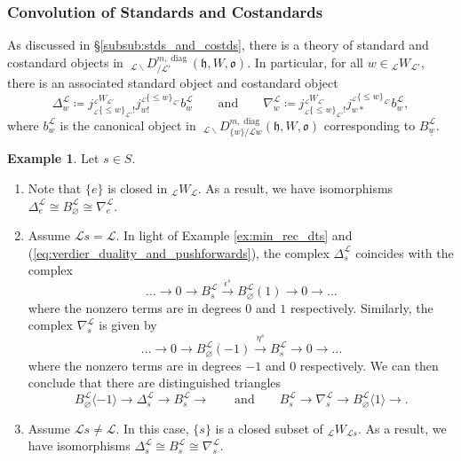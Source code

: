 \documentclass{amsart}
\newcommand{\scrL}{\mathcal{L}}
\newcommand{\fr}[1]{\mathfrak{#1}}
\DeclareMathOperator{\diag}{diag}
\newcommand{\DDBE}[2]{\:_{#1 \backslash} D_{/ #2}^{m, \diag}}
\newcommand{\DDBEI}[3]{\:_{#2 \backslash} D_{#1 / #3}^{m, \diag} }
\newcommand{\W}[2]{{}_{#1}W_{#2}}
\newcommand{\uw}{\underline{w}}
\renewcommand{\emptyset}{\varnothing}
\theoremstyle{definition}
\newtheorem{example}[subsubsection]{Example}
\numberwithin{equation}{subsection}
\begin{document}
\subsubsection{Convolution of Standards and Costandards}

As discussed in \S\ref{subsub:stds_and_costds}, there is a theory of standard and costandard objects in $\DDBE{\scrL}{\scrL'} (\fr{h}, W, \fr{o})$.
In particular, for all $w \in \W{\scrL}{\scrL'}$, there is an associated standard object and costandard object
\[ \Delta_w^{\scrL} \coloneq j_{{}_{\scrL }\{\leq w \}_{\scrL'} !}^{\W{\scrL}{\scrL'}} j_{w!}^{{}_{\scrL} \{\leq w \}_{\scrL'} } b_w^{\scrL} \qquad\text{and}\qquad \nabla_w^{\scrL} \coloneq j_{{}_{\scrL} \{\leq w \}_{\scrL'} !}^{\W{\scrL}{\scrL'}} j_{w*}^{{}_{\scrL} \{\leq w \}_{\scrL'}} b_w^{\scrL},\]
where $b_w^{\scrL}$ is the canonical object in $\DDBEI{\{ w \}}{\scrL}{\scrL w} (\fr{h}, W, \fr{o})$ corresponding to $B_{\uw}^{\scrL}$.

\begin{example}\label{ex:stds_and_costds_for_simples}
    Let $s \in S$.
    \begin{enumerate}
        \item Note that $\{e\}$ is closed in $\W{\scrL}{\scrL}$. As a result, we have isomorphisms $\Delta_e^{\scrL} \cong B_{\emptyset}^{\scrL} \cong \nabla_e^{\scrL}$.
        \item Assume $\scrL s = \scrL$. In light of Example \ref{ex:min_rec_dts} and (\ref{eq:verdier_duality_and_pushforwards}), the complex $\Delta_s^{\scrL}$ coincides with the complex
            \[\ldots \to 0 \to B_s^{\scrL} \stackrel{\epsilon^s}{\to} B_{\emptyset}^{\scrL} (1) \to 0 \to \ldots\]
            where the nonzero terms are in degrees $0$ and $1$ respectively. Similarly, the complex $\nabla_s^{\scrL}$ is given by
            \[\ldots \to 0 \to B_{\emptyset}^{\scrL} (-1) \stackrel{\eta^s}{\to} B_{s}^{\scrL} \to 0 \to \ldots\]
            where the nonzero terms are in degrees $-1$ and $0$ respectively.
            We can then conclude that there are distinguished triangles
            \[B_{\emptyset}^{\scrL} \langle -1 \rangle \to \Delta_s^{\scrL} \to B_s^{\scrL} \to\qquad\text{and}\qquad  B_s^{\scrL} \to \nabla_s^{\scrL} \to B_{\emptyset}^{\scrL} \langle 1 \rangle  \to.\]
        \item Assume $\scrL s \neq \scrL$. In this case, $\{s\}$ is a closed subset of $\W{\scrL}{\scrL s}$.
            As a result, we have isomorphisms $\Delta_s^{\scrL} \cong B_s^{\scrL} \cong \nabla_s^{\scrL}$.
    \end{enumerate}
\end{example}
\end{document}
